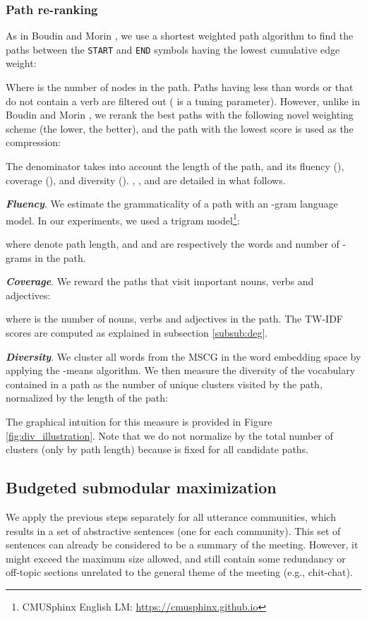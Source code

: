 \documentclass[11pt,a4paper]{article}
\begin{document}
\subsubsection*{Path re-ranking}
As in Boudin and Morin , we use a shortest weighted path algorithm to find the  paths between the \texttt{START} and \texttt{END} symbols having the lowest cumulative edge weight:

Where  is the number of nodes in the path. Paths having less than  words or that do not contain a verb are filtered out ( is a tuning parameter). However, unlike in Boudin and Morin , we rerank the  best paths with the following novel weighting scheme (the lower, the better), and the path with the lowest score is used as the compression:



\noindent The denominator takes into account the length of the path, and its fluency (), coverage (), and diversity (). , , and  are detailed in what follows.

\textbf{\textit{Fluency}}. We estimate the grammaticality of a path with an -gram language model. In our experiments, we used a trigram model\footnote{\tiny{CMUSphinx English LM: \url{https://cmusphinx.github.io}}}:


where  denote path length, and  and  are respectively the words and number of -grams in the path.

\textbf{\textit{Coverage}}. We reward the paths that visit important nouns, verbs and adjectives:

where  is the number of nouns, verbs and adjectives in the path. The TW-IDF scores are computed as explained in subsection \ref{subsub:deg}.

\textbf{\textit{Diversity}}. We cluster all words from the MSCG in the word embedding space by applying the -means algorithm. We then measure the diversity of the vocabulary contained in a path as the number of unique clusters visited by the path, normalized by the length of the path:


The graphical intuition for this measure is provided in Figure \ref{fig:div_illustration}. Note that we do not normalize  by the total number of clusters (only by path length) because  is fixed for all candidate paths.

\subsection{Budgeted submodular maximization} \label{subsec:submodularity}
We apply the previous steps separately for all utterance communities, which results in a set  of abstractive sentences (one for each community). This set of sentences can already be considered to be a summary of the meeting. However, it might exceed the maximum size allowed, and still contain some redundancy or off-topic sections unrelated to the general theme of the meeting (e.g., chit-chat). 
\end{document}
